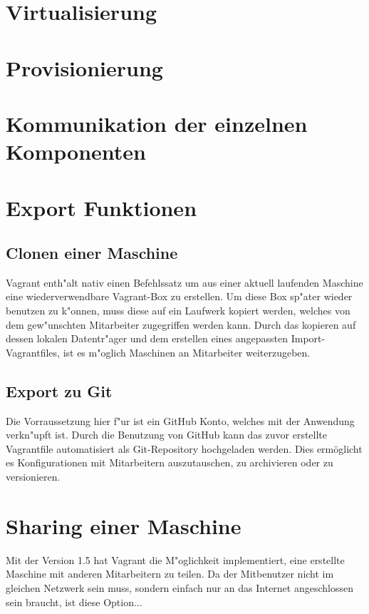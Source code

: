 \section{Virtualisierung}
\section{Provisionierung}
\section{Kommunikation der einzelnen Komponenten}
\section{Export Funktionen}

\subsection{Clonen einer Maschine}
Vagrant enth"alt nativ einen Befehlssatz um aus einer aktuell laufenden Maschine eine wiederverwendbare Vagrant-Box zu erstellen.\newline
Um diese Box sp"ater wieder benutzen zu k"onnen, muss diese auf ein Laufwerk kopiert werden, welches von dem gew"unschten Mitarbeiter zugegriffen werden kann. Durch das kopieren auf dessen lokalen Datentr"ager und dem erstellen eines angepassten Import-Vagrantfiles, ist es m"oglich Maschinen an Mitarbeiter weiterzugeben.

\subsection{Export zu Git}
Die Vorraussetzung hier f"ur ist ein GitHub Konto, welches mit der Anwendung verkn"upft ist. \newline
Durch die Benutzung von GitHub kann das zuvor erstellte Vagrantfile automatisiert als Git-Repository hochgeladen werden.\newline
Dies ermöglicht es Konfigurationen mit Mitarbeitern auszutauschen, zu archivieren oder zu versionieren.


\section{Sharing einer Maschine}
Mit der Version 1.5 hat Vagrant die M"oglichkeit implementiert, eine erstellte Maschine mit anderen Mitarbeitern zu teilen.\newline
Da der Mitbenutzer nicht im gleichen Netzwerk sein muss, sondern einfach nur an das Internet angeschlossen sein braucht, ist diese Option...



